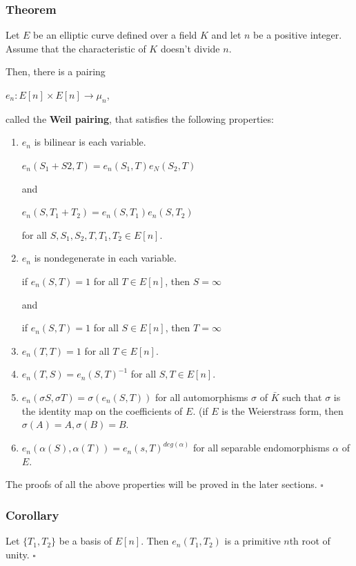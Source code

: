 \documentclass[a4paper, 12pt]{article}
\begin{document}
\subsubsection{Theorem}
Let $E$ be an elliptic curve defined over a field $K$ and let $n$ be a positive integer. Assume that the characteristic of $K$ doesn't divide $n$. \par Then, there is a pairing
\begin{center} $e_n: E[n] \times E[n] \rightarrow \mu_n$, \end{center}
called the \textbf{Weil pairing}, that satisfies the following properties:
\begin{enumerate}
	\item $e_n$ is bilinear is each variable. 
	\begin{center} 
	$e_n(S_1+S2,T) = e_n(S_1,T)e_N(S_2,T)$
	\end{center}
	and
	\begin{center}
	$e_n(S,T_1+T_2) = e_n(S,T_1)e_n(S,T_2)$
	\end{center}
	for all $S, S_1, S_2, T, T_1, T_2 \in E[n]$.
	\item $e_n$ is nondegenerate in each variable. 
	\begin{center} 
	if $e_n(S,T)=1$ for all $T \in E[n]$, then $S = \infty$\par
	and\par
	if $e_n(S,T)=1$ for all $S \in E[n]$, then $T= \infty$
	\end{center}
	\item $e_n(T,T)=1$ for all $T \in E[n]$.
	\item $e_n(T,S)=e_n(S,T)^{-1}$ for all $S,T \in E[n]$.
	\item $e_n(\sigma S, \sigma T) = \sigma(e_n(S,T))$ for all automorphisms $\sigma$ of $\bar{K}$ such that $\sigma$ is the identity map on the coefficients of $E$. (if $E$ is the Weierstrass form, then $\sigma(A) = A, \sigma(B)=B$.
	\item $e_n(\alpha(S),\alpha(T)) = e_n(s,T)^{deg(\alpha)}$ for all separable endomorphisms $\alpha$ of $E$. 
\end{enumerate}
The proofs of all the above properties will be proved in the later sections. $\square$\par
\subsubsection{Corollary}
Let $\{T_1,T_2\}$ be a basis of $E[n]$. Then $e_n(T_1,T_2)$ is a primitive $n$th root of unity. $\square$
\end{document}
